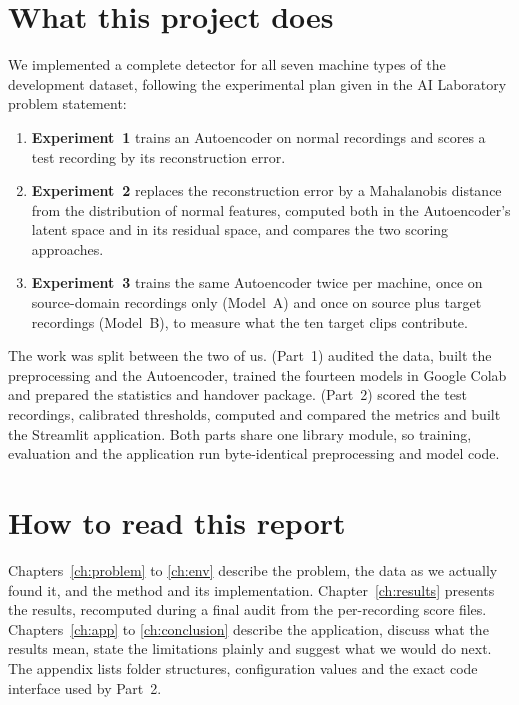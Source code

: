 \section{What this project does}
We implemented a complete detector for all seven machine types of the development dataset, following the experimental plan given in the AI Laboratory problem statement:
\begin{enumerate}
  \item \textbf{Experiment~1} trains an Autoencoder on normal recordings and scores a test recording by its reconstruction error.
  \item \textbf{Experiment~2} replaces the reconstruction error by a Mahalanobis distance from the distribution of normal features, computed both in the Autoencoder's latent space and in its residual space, and compares the two scoring approaches.
  \item \textbf{Experiment~3} trains the same Autoencoder twice per machine, once on source-domain recordings only (Model~A) and once on source plus target recordings (Model~B), to measure what the ten target clips contribute.
\end{enumerate}
The work was split between the two of us. \studentOne{} (Part~1) audited the data, built the preprocessing and the Autoencoder, trained the fourteen models in Google Colab and prepared the statistics and handover package. \studentTwo{} (Part~2) scored the test recordings, calibrated thresholds, computed and compared the metrics and built the Streamlit application. Both parts share one library module, so training, evaluation and the application run byte-identical preprocessing and model code.

\section{How to read this report}
Chapters~\ref{ch:problem} to \ref{ch:env} describe the problem, the data as we actually found it, and the method and its implementation. Chapter~\ref{ch:results} presents the results, recomputed during a final audit from the per-recording score files. Chapters~\ref{ch:app} to \ref{ch:conclusion} describe the application, discuss what the results mean, state the limitations plainly and suggest what we would do next. The appendix lists folder structures, configuration values and the exact code interface used by Part~2.
